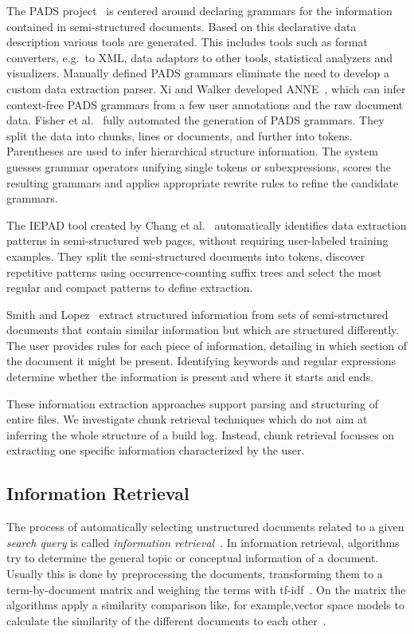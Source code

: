 \documentclass[\myrootdir/main.tex]{subfiles}
\begin{document}
The PADS project~\cite{fisher2011the-pads} is centered around declaring grammars for the information contained in semi-structured documents.
Based on this declarative data description various tools are generated.
This includes tools such as format converters, e.g.\ to XML, data adaptors to other tools, statistical analyzers and visualizers.
Manually defined PADS grammars eliminate the need to develop a custom data extraction parser.
Xi and Walker developed ANNE~\cite{xi2010a-context-free}, which can infer context-free PADS grammars from a few user annotations and the raw document data.
Fisher et al.~\cite{fisher2008from} fully automated the generation of PADS grammars.
They split the data into chunks, lines or documents, and further into tokens.
Parentheses are used to infer hierarchical structure information.
The system guesses grammar operators unifying single tokens or subexpressions, scores the resulting grammars and applies appropriate rewrite rules to refine the candidate grammars.

The IEPAD tool created by Chang et al.~\cite{chang2003automatic} automatically identifies data extraction patterns in semi-structured web pages, without requiring user-labeled training examples.
They split the semi-structured documents into tokens, discover repetitive patterns using occurrence-counting suffix trees and select the most regular and compact patterns to define extraction.

Smith and Lopez~\cite{smith1997information} extract structured information from sets of semi-structured documents that contain similar information but which are structured differently.
The user provides rules for each piece of information, detailing in which section of the document it might be present.
Identifying keywords and regular expressions determine whether the information is present and where it starts and ends.

These information extraction approaches support parsing and structuring of entire files.
We investigate chunk retrieval techniques which do not aim at inferring the whole structure of a build log.
Instead, chunk retrieval focusses on extracting one specific information characterized by the user.

\subsection{Information Retrieval}%
The process of automatically selecting unstructured documents related to a given \emph{search query} is called \emph{information retrieval}~\cite{schutze2008introduction}.
In information retrieval, algorithms try to determine the general topic or conceptual information of a document.
Usually this is done by preprocessing the documents, transforming them to a term-by-document matrix and weighing the terms with tf-idf~\cite{lee1997document}.
On the matrix the algorithms apply a similarity comparison like, for example,vector space models to calculate the similarity of the different documents to each other~\cite{panichella2016parameterizing}.
\end{document}
